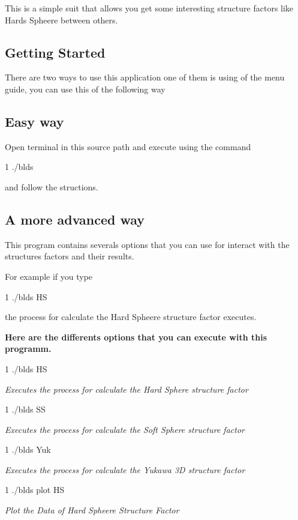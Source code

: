 This is a simple suit that allows you get some interesting structure factors like Hards Spheere between others.

\subsection*{Getting Started}

There are two ways to use this application one of them is using of the menu guide, you can use this of the following way \subsection*{Easy way}

Open terminal in this source path and execute using the command 
\begin{DoxyCode}
1 ./blds
\end{DoxyCode}
 and follow the structions.

\subsection*{A more advanced way}

This program contains severals options that you can use for interact with the structures factors and their results.

For example if you type 
\begin{DoxyCode}
1 ./blds HS
\end{DoxyCode}
 the process for calculate the Hard Spheere structure factor executes.

{\bfseries Here are the differents options that you can execute with this programm.}


\begin{DoxyCode}
1 ./blds HS
\end{DoxyCode}
 {\itshape Executes the process for calculate the Hard Sphere structure factor}


\begin{DoxyCode}
1 ./blds SS
\end{DoxyCode}
 {\itshape Executes the process for calculate the Soft Sphere structure factor}


\begin{DoxyCode}
1 ./blds Yuk
\end{DoxyCode}
 {\itshape Executes the process for calculate the Yukawa 3D structure factor}


\begin{DoxyCode}
1 ./blds plot HS
\end{DoxyCode}
 {\itshape Plot the Data of Hard Spheere Structure Factor}


